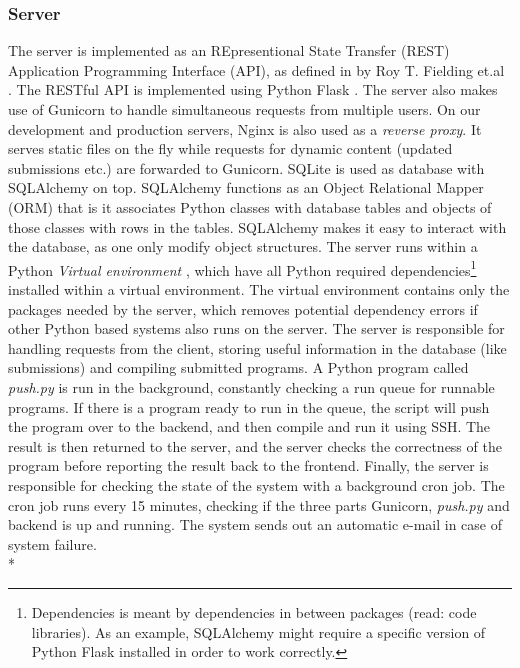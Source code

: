 \subsubsection{Server} The server is implemented as an REpresentional State Transfer (REST) Application Programming Interface (API), as defined in by Roy T. Fielding et.al \cite{a:rtf}. The RESTful API is implemented using Python Flask \cite{m:flask}. The server also makes use of Gunicorn \cite{m:guni} to handle simultaneous requests from multiple users. On our development and production servers, Nginx \cite{m:nginx} is also used as a \textit{reverse proxy}. It serves static files on the fly while requests for dynamic content (updated submissions etc.) are forwarded to Gunicorn. SQLite \cite{m:sqlite} is used as database with SQLAlchemy\cite{m:sqlalc} on top. SQLAlchemy functions as an Object Relational Mapper (ORM) that is it associates Python classes with database tables and objects of those classes with rows in the tables. SQLAlchemy makes it easy to interact with the database, as one only modify object structures. The server runs within a Python \textit{Virtual environment} \cite{m:virtualenv}, which have all Python required dependencies\footnote{Dependencies is meant by dependencies in between packages (read: code libraries). As an example, SQLAlchemy might require a specific version of Python Flask installed in order to work correctly.} installed within a virtual environment. The virtual environment contains only the packages needed by the server, which removes potential dependency errors if other Python based systems also runs on the server. The server is responsible for handling requests from the client, storing useful information in the database (like submissions) and compiling submitted programs. A Python program called \textit{push.py} is run in the background, constantly checking a run queue for runnable programs. If there is a program ready to run in the queue, the script will push the program over to the backend, and then compile and run it using SSH. The result is then returned to the server, and the server checks the correctness of the program before reporting the result back to the frontend. Finally, the server is responsible for checking the state of the system with a background cron job. The cron job runs every 15 minutes, checking if the three parts Gunicorn, \textit{push.py} and backend is up and running. The system sends out an automatic e-mail in case of system failure. \\*

